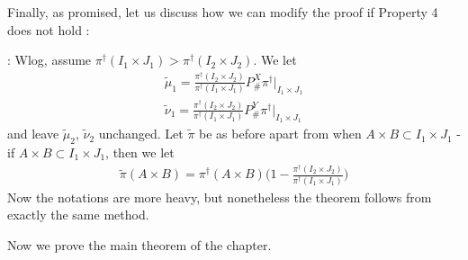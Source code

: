 \documentclass[12pt,a4paper]{article}
\newenvironment{proof}
{\begin{changemargin}{1cm}{0.5cm} 
	}%
	{\end{changemargin}
}
\newenvironment{subproof}
{\begin{changemargin}{0.5cm}{0.5cm} 
	}%
	{\end{changemargin}
}
\newenvironment{p}
{\begin{proof} 
	}%
	{\end{proof}
}
\begin{document}
\begin{p}
Finally, as promised, let us discuss how we can modify the proof if Property 4 does not hold :
\begin{subproof}
: Wlog, assume $\pi^{\dagger}(I_1\times J_1) > \pi^{\dagger}(I_2\times J_2)$. We let 
\begin{align*}
\tilde{\mu}_1 = \frac{\pi^{\dagger}(I_2 \times J_2)}{\pi^{\dagger}(I_1 \times J_1)} P_{\#}^{X} \pi^{\dagger} |_{I_1 \times J_1} \\
\tilde{\nu}_1 = \frac{\pi^{\dagger}(I_2 \times J_2)}{\pi^{\dagger}(I_1 \times J_1)} P_{\#}^{Y} \pi^{\dagger} |_{I_1 \times J_1}
\end{align*}
and leave $\tilde{\mu}_2$, $\tilde{\nu}_2$ unchanged. Let $\tilde{\pi}$ be as before apart from when $A\times B \subset I_1 \times J_1$ - if $A\times B \subset I_1 \times J_1$, then we let
\begin{align*}
\tilde{\pi}(A\times B) = \pi^{\dagger}(A\times B) \Big(1- \frac{\pi^{\dagger}(I_2 \times J_2)}{\pi^{\dagger}(I_1\times J_1)} \Big)
\end{align*}
Now the notations are more heavy, but nonetheless the theorem follows from exactly the same method.
\end{subproof}
\eop
\end{p}
\s

Now we prove the main theorem of the chapter.
\s
\end{document}
